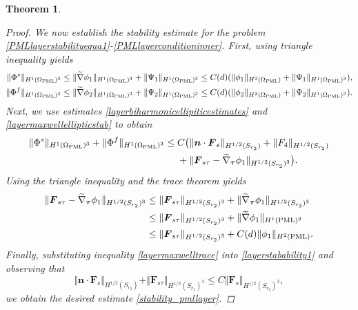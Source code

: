 \documentclass[11pt]{article}
\newcommand{\no}{\nonumber}
\newcommand{\Om}{\Omega}
\newcommand{\wid}{\widetilde}
\newcommand{\bs}{\boldsymbol}
\newcommand{\PML}{{\rm PML}}
\newtheorem{theorem}{Theorem}[section]
\begin{document}
\begin{theorem}
\begin{proof}
We now establish the stability estimate for the problem \eqref{PMLlayerstabilityequa1}-\eqref{PMLlayerconditioninner}. 
First, using triangle inequality yields
\begin{equation*}
\begin{aligned}
\Vert\Phi^s \Vert_{H^1(\Om_\PML)^3}&\leq	\Vert\wid{\nabla}\phi_1  \Vert_{H^1(\Om_\PML)^3}
+\Vert\Psi_1 \Vert_{H^1(\Om_\PML)^3}	
\leq C(d)(\Vert \phi_1\Vert_{H^2(\Om_\PML)}+\Vert\Psi_1 \Vert_{H^1(\Om_\PML)^3}),\\
\Vert\Phi^f \Vert_{H^1(\Om_\PML)^3}&\leq	\Vert\wid{\nabla}\phi_2  \Vert_{H^1(\Om_\PML)^3}
+\Vert\Psi_2 \Vert_{H^1(\Om_\PML)^3}	
\leq C(d)(\Vert \phi_2\Vert_{H^2(\Om_\PML)}+\Vert\Psi_2 \Vert_{H^1(\Om_\PML)^3}).
\end{aligned}
\end{equation*}
Next, we use estimates \eqref{layerbiharmonicellipiticestimates} and \eqref{layermaxwellellipticstab} to obtain
\begin{align}\label{layerstabability1}
\Vert\Phi^s \Vert_{H^1(\Om_\PML)^3}+\Vert\Phi^f \Vert_{H^1(\Om_\PML)^3}\leq\;&C\big(\Vert 
\bs{n}\cdot\bs{F}_s\Vert_{H^{1/2}(S_{r_2})}+\Vert F_4\Vert_{H^{1/2}(S_{r_2} )}\\ \no
&+\Vert \bs{F}_{s\tau}-\wid{\nabla}_{\bs{\tau}}\phi_1\Vert_{H^{1/2}(S_{r_2} )^3}\big).
\end{align}
Using the triangle inequality and the trace theorem yields
\begin{equation}\label{layermaxwelltrace}
\begin{aligned}
\Vert \bs{F}_{s\tau}-\wid{\nabla}_{\bs{\tau}}\phi_1\Vert_{H^{1/2}(S_{r_2} )^3}&\leq
\Vert \bs{F}_{s\tau}\Vert_{H^{1/2}(S_{r_2})^3}+\Vert \wid{\nabla}_{\bs{\tau}}\phi_1\Vert_{H^{1/2}(S_{r_2} )^3}\\
&\leq \Vert \bs{F}_{s\tau}\Vert_{H^{1/2}(S_{r_2})^3}+\Vert \wid{\nabla}\phi_1\Vert_{H^{1}(\PML)^3} \\
&\leq \Vert \bs{F}_{s\tau}\Vert_{H^{1/2}(S_{r_2})^3}+C(d)\Vert \phi_1\Vert_{H^{2}(\PML)} .
\end{aligned}
\end{equation}
Finally, substituting inequality \eqref{layermaxwelltrace} into \eqref{layerstabability1} and observing that
\begin{equation*}
\Vert \bs{n}\cdot\bs{F}_s\Vert_{H^{1/2}(S_{r_2})}+ \Vert \bs{F}_{s\tau}\Vert_{H^{1/2}(S_{r_2})^3}
\leq C \Vert \bs{F}_{s}\Vert_{H^{1/2}(S_{r_2})^3},
\end{equation*}
we obtain the desired estimate \eqref{stability_pmllayer}.

\end{proof}
\end{theorem}
\end{document}
